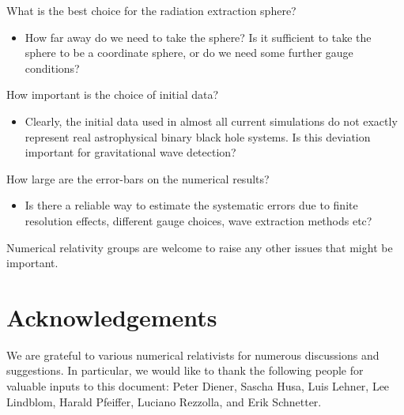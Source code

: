\documentclass[prd,preprintnumbers,superscriptaddress,eqsecnum]{revtex4}
\numberwithin{equation}{section}
\begin{document}
What is the best choice for the radiation extraction sphere?
\begin{itemize}
\item How far away do we need to take the sphere?  Is it sufficient to
  take the sphere to be a coordinate sphere, or do we need some
  further gauge conditions?
\end{itemize}
How important is the choice of initial data?
\begin{itemize}
\item Clearly, the initial data used in almost all current simulations
  do not exactly represent real astrophysical binary black hole
  systems.  Is this deviation important for gravitational wave
  detection?
\end{itemize}
How large are the error-bars on the numerical results?
\begin{itemize}
\item Is there a reliable way to estimate the systematic errors due to
  finite resolution effects, different gauge choices, wave extraction
  methods etc?  
\end{itemize}

Numerical relativity groups are welcome to raise any other issues that
might be important.


\section*{Acknowledgements}

We are grateful to various numerical relativists for numerous
discussions and suggestions.  In particular, we would like to thank
the following people for valuable inputs to this document: Peter
Diener, Sascha Husa, Luis Lehner, Lee Lindblom, Harald Pfeiffer,
Luciano Rezzolla, and Erik Schnetter. 
\end{document}
